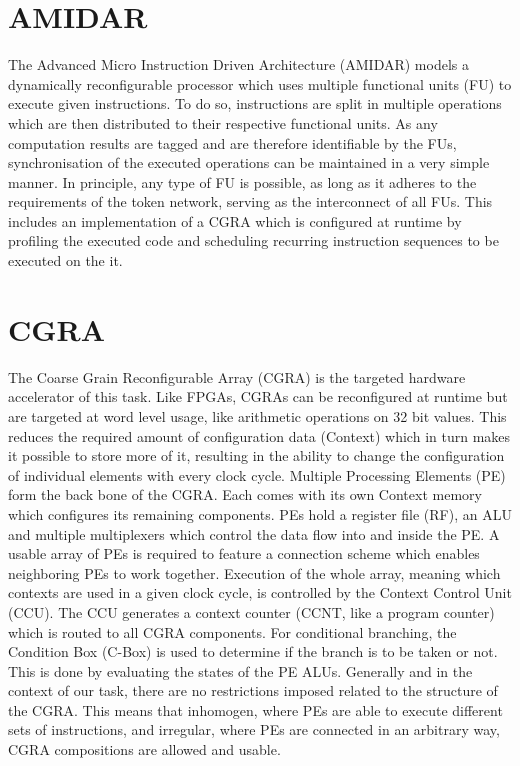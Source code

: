 	\section{AMIDAR} %
	\label{sec:intro_amidar}
		The Advanced Micro Instruction Driven Architecture (AMIDAR) models a dynamically reconfigurable processor which uses multiple functional units (FU) to execute given instructions. 
		To do so, instructions are split in multiple operations which are then distributed to their respective functional units. As any computation results are tagged and are therefore identifiable by the FUs, synchronisation of the executed operations can be maintained in a very simple manner. 
		In principle, any type of FU is possible, as long as it adheres to the requirements of the token network, serving as the interconnect of all FUs. This includes an implementation of a CGRA which is configured at runtime by profiling the executed code and scheduling recurring instruction sequences to be executed on the it.

	\section{CGRA} %
	\label{sec:intro_cgra}
		The Coarse Grain Reconfigurable Array (CGRA) is the targeted hardware accelerator of this task. Like FPGAs, CGRAs can be reconfigured at runtime but are targeted at word level usage, like arithmetic operations on \num{32} bit values. This reduces the required amount of configuration data (Context) which in turn makes it possible to store more of it, resulting in the ability to change the configuration of individual elements with every clock cycle.
		Multiple Processing Elements (PE) form the back bone of the CGRA. Each comes with its own Context memory which configures its remaining components. PEs hold a register file (RF), an ALU and multiple multiplexers which control the data flow into and inside the PE. 
		A usable array of PEs is required to feature a connection scheme which enables neighboring PEs to work together.
		Execution of the whole array, meaning which contexts are used in a given clock cycle, is controlled by the Context Control Unit (CCU). The CCU generates a context counter (CCNT, like a program counter) which is routed to all CGRA components. For conditional branching, the Condition Box (C-Box) is used to determine if the branch is to be taken or not. This is done by evaluating the states of the PE ALUs.
		Generally and in the context of our task, there are no restrictions imposed related to the structure of the CGRA. This means that inhomogen, where PEs are able to execute different sets of instructions, and irregular, where PEs are connected in an arbitrary way, CGRA compositions are allowed and usable.

